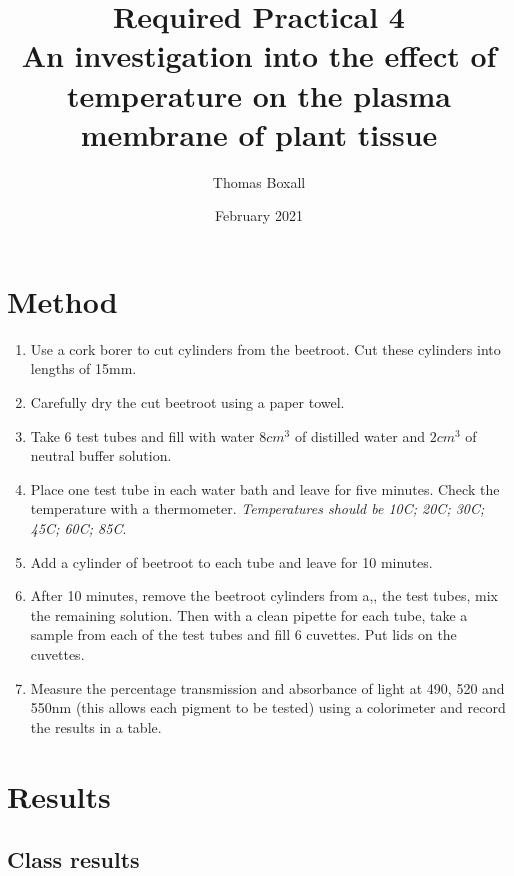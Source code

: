 \documentclass{thomasClass}
\title{\textbf{Required Practical 4}
\\An investigation into the effect of temperature on the plasma membrane of plant tissue
}
\author{Thomas Boxall}
\date{February 2021}
\begin{document}
\maketitle

\section{Method}
\begin{enumerate}
    \item Use a cork borer to cut cylinders from the beetroot. Cut these cylinders into lengths of 15mm.
    \item Carefully dry the cut beetroot using a paper towel.
    \item Take 6 test tubes and fill with water $8cm^3$ of distilled water and $2cm^3$ of neutral buffer solution.
    \item Place one test tube in each water bath and leave for five minutes. Check the temperature with a thermometer. \textit{Temperatures should be 10\textdegree C; 20\textdegree C; 30\textdegree C; 45\textdegree C; 60\textdegree C; 85\textdegree C}.
    \item Add a cylinder of beetroot to each tube and leave for 10 minutes.
    \item After 10 minutes, remove the beetroot cylinders from a,, the test tubes, mix the remaining solution. Then with a clean pipette for each tube, take a sample from each of the test tubes and fill 6 cuvettes. Put lids on the cuvettes.
    \item Measure the percentage transmission and absorbance of light at 490, 520 and 550nm (this allows each pigment to be tested) using a colorimeter and record the results in a table.
\end{enumerate}
\section{Results}
\subsection{Class results}
\end{document}
